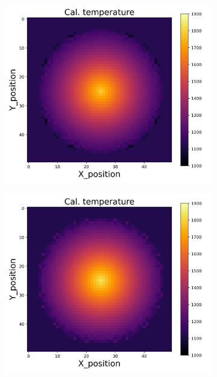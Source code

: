 {\begin{figure}[p]
\begin{minipage}{\textwidth}
\begin{subfigure}{0.325\textwidth}
        \end{subfigure}
    \end{minipage}\\
    \begin{minipage}{\textwidth}
        \centering
        \begin{subfigure}{0.325\textwidth}
            \centering
            \includegraphics[width=\textwidth]{figures/raw_data/22/mix/T_cal.jpg}
        \end{subfigure}
        \begin{subfigure}{0.325\textwidth}
            \centering
            \includegraphics[width=\textwidth]{figures/raw_data/23/mix/T_cal.jpg}

\end{subfigure}
\end{minipage}
\end{figure}}
